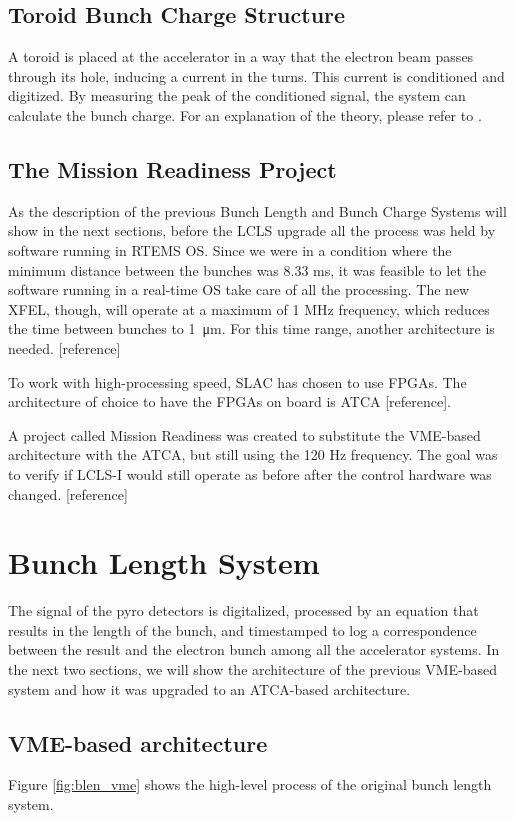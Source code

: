 \documentclass[letter,
        biblatex,   %
        keeplastbox,  %
        ]{jacow}
\begin{document}
\subsection{Toroid Bunch Charge Structure}
A toroid is placed at the accelerator in a way that the electron beam passes through its hole, inducing a current in the turns. This current is conditioned and digitized. By measuring the peak of the conditioned signal, the system can calculate the bunch charge. For an explanation of the theory, please refer to \cite{slac-pub-398}.

\subsection{The Mission Readiness Project}
As the description of the previous Bunch Length and Bunch Charge Systems will show in the next sections, before the LCLS upgrade all the process was held by software running in RTEMS OS. Since we were in a condition where the minimum distance between the bunches was 8.33 ms, it was feasible to let the software running in a real-time OS take care of all the processing. The new XFEL, though, will operate at a maximum of 1 MHz frequency, which reduces the time between bunches to \SI{1}{\micro\meter}. For this time range, another architecture is needed. [reference]

To work with high-processing speed, SLAC has chosen to use FPGAs. The architecture of choice to have the FPGAs on board is ATCA [reference].

A project called Mission Readiness was created to substitute the VME-based architecture with the ATCA, but still using the 120 Hz frequency. The goal was to verify if LCLS-I would still operate as before after the control hardware was changed. [reference]

\section{Bunch Length System}
The signal of the pyro detectors is digitalized, processed by an equation that results in the length of the bunch, and timestamped to log a correspondence between the result and the electron bunch among all the accelerator systems. In the next two sections, we will show the architecture of the previous VME-based system and how it was upgraded to an ATCA-based architecture.

\subsection{VME-based architecture}
Figure \ref{fig:blen_vme} shows the high-level process of the original bunch length system.
\end{document}
